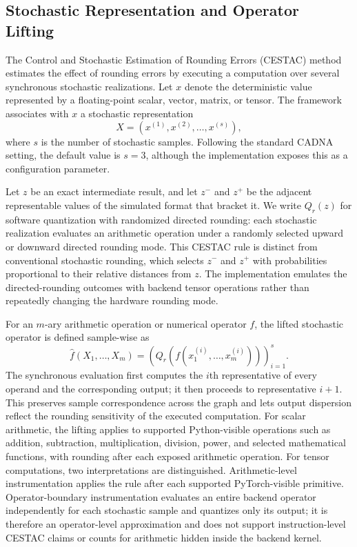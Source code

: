 \documentclass[manuscript, screen]{acmart}
\begin{document}
\subsection{Stochastic Representation and Operator Lifting}

The Control and Stochastic Estimation of Rounding Errors (CESTAC) method~\citep{vignes1974error,VIGNES1993233} estimates the effect of rounding errors by executing a computation over several synchronous stochastic realizations. Let $x$ denote the deterministic value represented by a floating-point scalar, vector, matrix, or tensor. The framework associates with $x$ a stochastic representation
\begin{equation}
X = \left(x^{(1)},x^{(2)},\ldots,x^{(s)}\right),
\label{eq:stochastic_representation}
\end{equation}
where $s$ is the number of stochastic samples. Following the standard CADNA setting, the default value is $s=3$, although the implementation exposes this as a configuration parameter.

Let $z$ be an exact intermediate result, and let $z^{-}$ and $z^{+}$ be the adjacent representable values of the simulated format that bracket it. We write $Q_r(z)$ for software quantization with randomized directed rounding: each stochastic realization evaluates an arithmetic operation under a randomly selected upward or downward directed rounding mode. This CESTAC rule is distinct from conventional stochastic rounding, which selects $z^{-}$ and $z^{+}$ with probabilities proportional to their relative distances from $z$. The implementation emulates the directed-rounding outcomes with backend tensor operations rather than repeatedly changing the hardware rounding mode.

For an $m$-ary arithmetic operation or numerical operator $f$, the lifted stochastic operator is defined sample-wise as
\begin{equation}
\widehat{f}(X_1,\ldots,X_m)
=
\left(
Q_r\!\left(f\left(x_1^{(i)},\ldots,x_m^{(i)}\right)\right)
\right)_{i=1}^{s}.
\label{eq:lifted_operator}
\end{equation}
The synchronous evaluation first computes the $i$th representative of every operand and the corresponding output; it then proceeds to representative $i+1$. This preserves sample correspondence across the graph and lets output dispersion reflect the rounding sensitivity of the executed computation. For scalar arithmetic, the lifting applies to supported Python-visible operations such as addition, subtraction, multiplication, division, power, and selected mathematical functions, with rounding after each exposed arithmetic operation. For tensor computations, two interpretations are distinguished. Arithmetic-level instrumentation applies the rule after each supported PyTorch-visible primitive. Operator-boundary instrumentation evaluates an entire backend operator independently for each stochastic sample and quantizes only its output; it is therefore an operator-level approximation and does not support instruction-level CESTAC claims or counts for arithmetic hidden inside the backend kernel.
\end{document}

